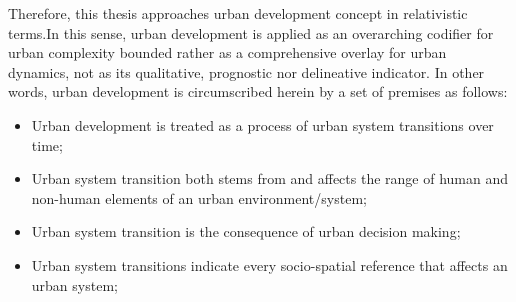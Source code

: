\documentclass[11pt]{report}
\begin{document}
Therefore, this thesis approaches urban development concept in relativistic terms.\footnotemark In this sense, urban development is applied as an overarching codifier for urban complexity bounded rather as a comprehensive overlay for urban dynamics, not as its qualitative, prognostic nor delineative indicator. In other words,  urban development is circumscribed herein by a set of premises as follows:
\begin{itemize}
\item Urban development is treated as a process of urban system transitions over time;
\item Urban system transition both stems from and affects the range of human and non-human elements of an urban environment/system;
\item Urban system transition is the consequence of urban decision making;
\item Urban system transitions indicate every socio-spatial reference that affects an urban system;
\end {itemize}
\end{document}
